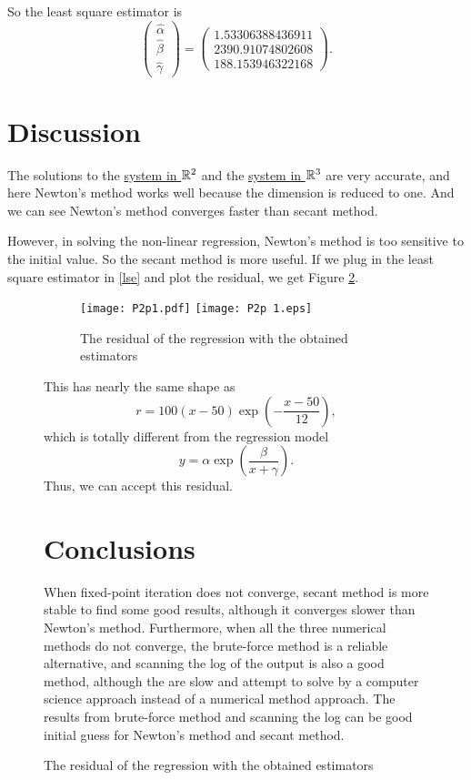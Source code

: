 \begin{table}[H]
\begin{table}[H]
\begin{table}[H]
\begin{table}[H]
\begin{table}[H]
So the least square estimator is
\begin{equation}\label{lse}
\begin{pmatrix} \hat\alpha \\ \hat\beta \\ \hat\gamma \end{pmatrix}=\begin{pmatrix} 1.53306388436911 \\ 2390.91074802608 \\ 188.153946322168 \end{pmatrix}.
\end{equation}


\section{Discussion}
The solutions to the \hyperref[eqn1]{system in \(\mathbb{R}^2\)} and the \hyperref[eqn2]{system in \(\mathbb{R}^3\)} are very accurate, and here Newton's method works well because the dimension is reduced to one.
And we can see Newton's method converges faster than secant method.

However, in solving the non-linear regression, Newton's method is too sensitive to the initial value.
So the secant method is more useful.
If we plug in the least square estimator in \ref{lse} and plot the residual, we get Figure \ref{residual}.
\ifnum{}
	\begin{figure}[H]
\else
	\begin{figure}[htbp]
\fi
	\centering
	\ifpdf
		\texttt{[image: P2p1.pdf]}
	\else
		\texttt{[image: P2p	1.eps]}
	\fi
	\caption{The residual of the regression with the obtained estimators}
	\label{residual}
	\end{figure}

This has nearly the same shape as
\[	r=100(x-50)\exp\left(-\frac{x-50}{12} \right), \]
which is totally different from the regression model
\[	y=\alpha\exp\left(\frac{\beta}{x+\gamma}\right). \]
Thus, we can accept this residual.	


\section{Conclusions}

When fixed-point iteration does not converge, secant method is more stable to find some good results, although it converges slower than Newton's method.
Furthermore, when all the three numerical methods do not converge, the brute-force method is a reliable alternative, and scanning the log of the output is also a good method, although the are slow and attempt to solve by a computer science approach instead of a numerical method approach.
The results from brute-force method and scanning the log can be good initial guess for Newton's method and secant method.





\end{figure}
\end{table}
\end{table}
\end{table}
\end{table}
\end{table}
